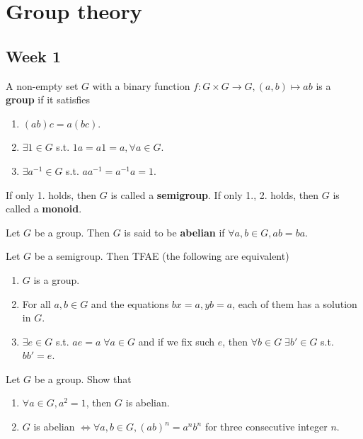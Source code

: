 \section{Group theory}

\subsection{Week 1}

\begin{definition}
  A non-empty set $G$ with a binary function $f: G \times G \to G,
  (a, b) \mapsto ab$
  is a {\bf group} if it satisfies
  \begin{enumerate}
    \item $(ab)c = a(bc)$.
    \item $\exists 1 \in G$ s.t. $1a = a1 = a, \forall a \in G$.
    \item $\exists a^{-1} \in G$ s.t. $aa^{-1} = a^{-1}a = 1$.
  \end{enumerate}
  If only 1. holds, then $G$ is called a {\bf semigroup}.
  If only 1., 2. holds, then $G$ is called a {\bf monoid}.
\end{definition}

\begin{definition}
  Let $G$ be a group. Then $G$ is said to be {\bf abelian} if
  $\forall a, b \in G, ab = ba$.
\end{definition}

\begin{exercise}
  Let $G$ be a semigroup. Then TFAE (the following are equivalent)
  \begin{enumerate}
    \item $G$ is a group.
    \item For all $a, b \in G$ and the equations $bx=a, yb=a$, each of them
      has a solution in $G$.
    \item $\exists e \in G$ s.t. $ae=a \; \forall a \in G$ and if we fix
      such $e$, then $\forall b \in G \; \exists b' \in G$ s.t. $bb' = e$.
  \end{enumerate}
\end{exercise}

\begin{exercise}
  Let $G$ be a group. Show that
  \begin{enumerate}
    \item $\forall a \in G, a^2 = 1$, then $G$ is abelian.
    \item $G$ is abelian $\iff \forall a, b \in G, (ab)^n = a^n b^n$ for three
      consecutive integer $n$.
  \end{enumerate}
\end{exercise}

